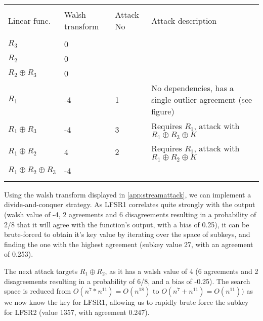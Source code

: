\documentclass[british,11pt,a4paper]{article}
\begin{document}
\begin{center}
	\begin{tabular}{@{}llll@{}}\label{tab:streamattack} \\
		\toprule \\
		Linear func.                  & Walsh transform & Attack No & Attack description                                           \\
		\midrule \\
		\(R_3\) & 0 \\
		\(R_2\)                       & 0               &           &                                                              \\
		\(R_2 \oplus R_3\)            & 0               &           &                                                              \\
		\(R_1\)                       & -4              & 1         & No dependencies, has a single outlier agreement (see figure) \\
		\(R_1 \oplus R_3\)            & -4              & 3         & Requires \(R_1\), attack with \(R_1 \oplus R_3 \oplus K\)    \\
		\(R_1 \oplus R_2\)            & 4               & 2         & Requires \(R_1\), attack with \(R_1 \oplus R_2 \oplus K\)    \\
		\(R_1 \oplus R_2 \oplus R_3\) & -4              &           &                                                              \\

		\bottomrule \\
	\end{tabular}
\end{center}
Using the walsh transform displayed in \autoref{app:streamattack}, we can implement a divide-and-conquer strategy.
As LFSR1 correlates quite strongly with the output (walsh value of -4, 2 agreements and 6 disagreements resulting in a probability of 2/8 that it will agree with the function's output, with a bias of 0.25),
it can be brute-forced to obtain it's key value by iterating over the space of subkeys, and finding the one with the highest agreement (subkey value 27, with an agreement of 0.253).

The next attack targets \(R_1 \oplus R_2\), as it has a walsh value of 4 (6 agreements and 2 disagreements resulting in a probability of 6/8, and a bias of -0.25).
The search space is reduced from \(O(n^{7} * n^{11})=O(n^{18})\) to \(O(n^7 + n^{11})=O(n^{11}))\) as we now know the key for LFSR1, allowing us to rapidly brute force the subkey for LFSR2 (value 1357, with agreement 0.247).
\end{document}

